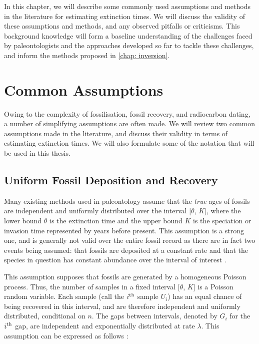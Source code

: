 
In this chapter, we will describe some commonly used assumptions and methods in the literature for estimating extinction times. We will discuss the validity of these assumptions and methods, and any observed pitfalls or criticisms. This background knowledge will form a baseline understanding of the challenges faced by paleontologists and the approaches developed so far to tackle these challenges, and inform the methods proposed in \autoref{chap: inversion}.

\section{Common Assumptions}

Owing to the complexity of fossilisation, fossil recovery, and radiocarbon dating, a number of simplifying assumptions are often made. We will review two common assumptions made in the literature, and discuss their validity in terms of estimating extinction times. We will also formulate some of the notation that will be used in this thesis.

\subsection{Uniform Fossil Deposition and Recovery}\label{ssec: ass_unif}

Many existing methods used in paleontology assume that the \textit{true} ages of fossils are independent and uniformly distributed over the interval [$\theta$, $K$], where the lower bound $\theta$ is the extinction time and the upper bound $K$ is the speciation or invasion time represented by years before present. This assumption is a strong one, and is generally not valid over the entire fossil record as there are in fact two events being assumed: that fossils are deposited at a constant rate and that the species in question has constant abundance over the interval of interest \parencite{Lee2010}. 

This assumption supposes that fossils are generated by a homogeneous Poisson process. Thus, the number of samples in a fixed interval [$\theta$, $K$] is a Poisson random variable. Each sample (call the $i\textsuperscript{th}$ sample $U_i$) has an equal chance of being recovered in this interval, and are therefore independent and uniformly distributed, conditional on $n$. The gaps between intervals, denoted by $G_i$ for the $i\textsuperscript{th}$ gap, are independent and exponentially distributed at rate $\lambda$. This assumption can be expressed as follows \parencite{Strauss1989}:

